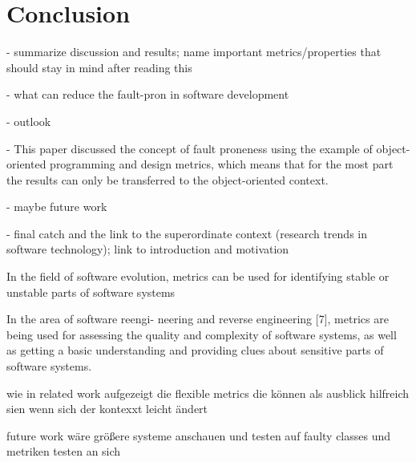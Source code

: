 \section{Conclusion}\label{conclusion}

- summarize discussion and results; name important metrics/properties that should stay in mind after reading this

- what can reduce the fault-pron in software development

- outlook

- This paper discussed the concept of fault proneness using the example of object-oriented programming and design metrics, which means that for the most part the results can only be transferred to the object-oriented context.

- maybe future work

- final catch and the link to the superordinate context (research trends in software technology); link to introduction and motivation

In the field of software evolution, metrics can be used for identifying stable or unstable
parts of software systems

In the area of software reengi-
neering and reverse engineering [7], metrics are being used
for assessing the quality and complexity of software systems,
as well as getting a basic understanding and providing clues
about sensitive parts of software systems.

wie in related work aufgezeigt die flexible metrics die können als ausblick hilfreich sien wenn sich der kontexxt leicht ändert

future work wäre größere systeme anschauen und testen auf faulty classes und metriken testen an sich